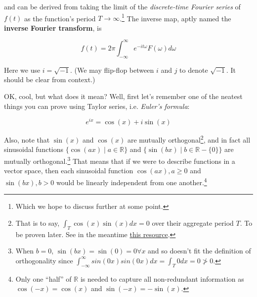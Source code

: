 \documentclass[letterpaper,12pt]{report}
\begin{document}
and can be derived from taking 
the limit of the \emph{discrete-time Fourier series} of \(f(t)\) as the function's
period \(T \rightarrow \infty\).\footnote{
  Which we hope to discuss further at some point.
}
The inverse map, aptly named the
\textbf{inverse Fourier transform},
is 

\begin{equation}
  f(t) = {2\pi} \int_{-\infty}^{\infty}e^{-it\omega}F(\omega)d\omega
\end{equation}\label{equation:inverse-fourier-transform}

Here we use \(i = \sqrt{-1}\).
(We may flip-flop between \(i\) and \(j\) to denote \(\sqrt{-1}\).
It should be clear from context.)\par

OK, cool, but what does it mean? Well, first let's remember one of the neatest things
you can prove using Taylor series, i.e. \emph{Euler's formula}:

\[e^{ix} = \cos(x) + i\sin(x) \]

Also, note that
\(\sin(x)\) and \(\cos(x)\)
are mutually orthogonal\footnote{
  That is to say,
  \(\int_T \cos(x)\sin(x)dx = 0 \)
  over their aggregate period \(T\).
  To be proven later. See in the meantime
  \href{http://tutorial.math.lamar.edu/Classes/DE/PeriodicOrthogonal.aspx}{this resource}.
},
and in fact all sinusoidal functions
\(\{\cos(ax) \mid a \in \mathbb{R}\}\) and \(\{\sin(bx) \mid b \in \mathbb{R}-\{0\}\}\)
are mutually orthogonal.\footnote{
  When \(b=0\), \(\sin(bx) = \sin(0) = 0 \forall x\) and so doesn't fit the definition 
  of orthogonality since \(\int_{-\infty}^{\infty}sin(0x)sin(0x)dx = \int_T 0 dx = 0 \ngtr 0\).
}
That means that if we were to describe functions in a vector space, then each 
sinusoidal function \(\cos(ax), a \geq 0\) and 
\(\sin(bx), b > 0\) 
would be linearly independent from one another.\footnote{
  Only one ``half'' of \(\mathbb{R}\) is needed to capture all non-redundant information
  as \(\cos(-x) = \cos(x)\) and \(\sin(-x) = -\sin(x)\).
}
\par
\end{document}
